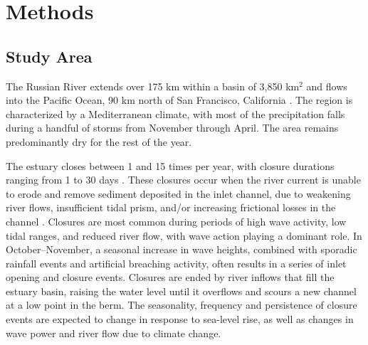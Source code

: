 \documentclass[preprint,12pt,authoryear]{elsarticle}
\begin{document}
\section{Methods}
\label{sec:methods}

\subsection{Study Area}
\label{sec:study_area}

The Russian River extends over 175 km within a basin of 3,850 km$^2$ and flows into the Pacific Ocean, 90 km north of San Francisco, California \citep[see Figure 1,][]{behrens2009characterization}. The region is characterized by a Mediterranean climate, with most of the precipitation falls during a handful of storms from November through April.  The area remains predominantly dry for the rest of the year. 

The estuary closes between 1 and 15 times per year, with closure durations ranging from 1 to 30 days \citep{behrens2009characterization, largier20205}.
 These closures occur when the river current is unable to erode and remove sediment deposited in the inlet channel,  due to weakening river flows, insufficient tidal prism, and/or increasing frictional losses in the channel \citep{behrens2013episodic}.  Closures are most common during periods of high wave activity, low tidal ranges, and reduced river flow, with wave action playing a dominant role. In October–November, a seasonal increase in wave heights, combined with sporadic rainfall events and artificial breaching activity, often results in a series of inlet opening and closure events. Closures are ended by river inflows that fill the estuary basin,  raising the water level until it overflows and scours a new channel at a low point in the berm.
 The seasonality, frequency and persistence of closure events are expected to change in response to sea-level rise, as well as changes in wave power and river flow due to climate change.

\end{document}
